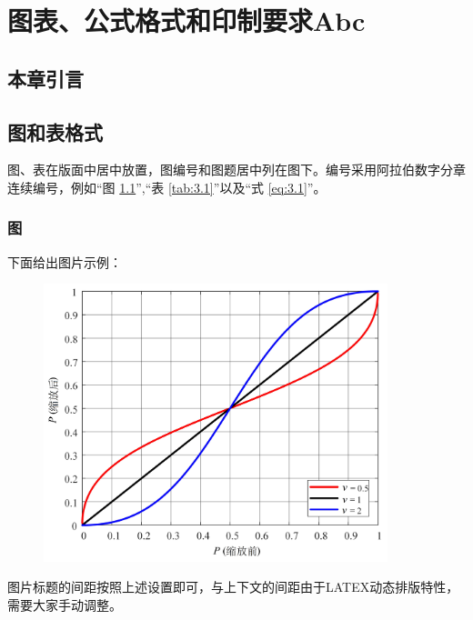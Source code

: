 

\chapter{图表、公式格式和印制要求Abc}
\thispagestyle{others}
\pagestyle{others}

\section{本章引言}


\section{图和表格式}

图、表在版面中居中放置，图编号和图题居中列在图下。编号采用阿拉伯数字分章连续编号，例如“图 \ref{fig:3.1}”,“表 \ref{tab:3.1}”以及“式 \ref{eq:3.1}”。

\subsection{图}
下面给出图片示例：

\vspace{-0.15cm}

\begin{figure}[h]
		\centering 
		\includegraphics[width=10cm]{chapters/chapter3/31.jpg}
		\label{fig:3.1} 
\end{figure}

\vspace{-0.5cm}

图片标题的间距按照上述设置即可，与上下文的间距由于LATEX动态排版特性，需要大家手动调整。

